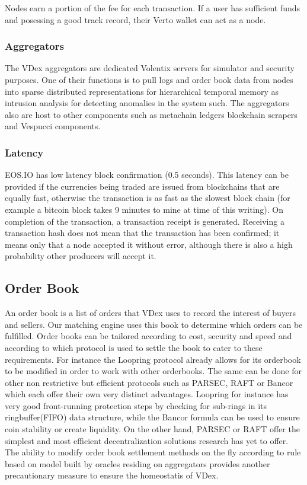 \documentclass[]{article}
\begin{document}
Nodes earn a portion of the fee for each transaction.
If a user has sufficient funds and posessing a good track record, their Verto wallet can act as a node.
	
	\subsubsection{Aggregators}
	
	The VDex aggregators are dedicated Volentix servers for simulator and security purposes. 
	One of their functions is to pull logs and order book data from nodes into sparse distributed representations for hierarchical temporal memory as intrusion \cite{24} analysis for detecting anomalies in the system such. The aggregators also are host to other components such as metachain ledgers\cite{20} blockchain scrapers and Vespucci components.
	 
	
	\subsubsection{Latency}	
	EOS.IO has low latency block confirmation (0.5 seconds).\cite{3}
	This latency can be provided if the currencies being traded are issued from blockchains that are equally fast, otherwise the transaction is as fast as the slowest block chain
	(for example a bitcoin block takes 9 minutes to mine at time of this writing). 
	On completion of the transaction, a transaction receipt is generated. 
	Receiving a transaction hash does not mean that the transaction has been confirmed; it means only that a node accepted it without error, although there is also a high probability other producers will accept it. 

\subsection{Order Book}
An order book is a list of orders that VDex uses to record the interest of buyers and sellers. Our matching engine uses this book to determine which orders can be fulfilled.
Order books can be tailored according to cost, security and speed and according to which protocol is used to settle the book to cater to these requirements. For instance the Loopring protocol already allows for its orderbook to be modified in order to work with other orderbooks.\cite{7} The same can be done for other non restrictive but efficient protocols such as PARSEC, RAFT or Bancor which each offer their own very distinct advantages. Loopring for instance has very good front-running protection steps by checking for sub-rings in its ringbuffer(FIFO) data structure, while the Bancor formula can be used to ensure coin stability or create liquidity. On the other hand, PARSEC or RAFT offer the simplest and most efficient decentralization solutions research has yet to offer.
The ability to modify order book settlement methods on the fly according to rule based on model built by oracles residing on aggregators provides another precautionary measure to ensure the homeostatis of VDex.
  
\end{document}
